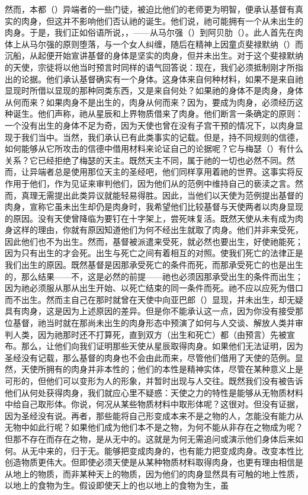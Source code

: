 然而，本都（）异端者的一些门徒，被迫比他们的老师更为明智，便承认基督有真实的肉身，但这并不影响他们否认祂的诞生。他们说，祂可能拥有一个从未出生的肉身。于是，我们正如俗语所说，，——从马尔强（）到阿贝肋（）。此人首先在肉体上从马尔强的原则堕落，与一个女人纠缠，随后在精神上因童贞斐禄默纳（）而沉船，从起便开始宣讲基督的身体是坚实的肉身，但并未出生。对于这个斐禄默纳的天使，宗徒将以他当时预言时同样的语气回答说：现在，我们必须抵制刚才所指出的论据。他们承认基督确实有一个身体。这身体来自何种材料，如果不是来自祂显现时所借以显现的那种同类东西，又是来自何处？如果祂的身体不是肉身，身体从何而来？如果肉身不是出生的，肉身从何而来？因为，要成为肉身，必须经历这种诞生。他们声称，祂从星辰和上界物质借来了肉身。他们断言一条确定的原则：一个没有出生的身体不足为奇，因为天使也曾在没有子宫干预的情况下，以肉身显现于我们当中。当然，我们承认已有此类事实的记载。但是，持不同规则的信德，如何能够从它所攻击的信德中借用材料来论证自己的论据呢？它与梅瑟（）有什么关系？它已经拒绝了梅瑟的天主。既然天主不同，属于祂的一切也必然不同。然而，让异端者总是使用那位天主的圣经吧，他们同样享用着祂的世界。这事实将反作用于他们，作为见证来审判他们，因为他们从的范例中维持自己的亵渎之言。然而，真理无需提出此类异议就能轻易得胜。因此，当他们以天使为范例提出基督的肉身，宣称它虽未出生却仍是肉身时，我希望他们比较基督与天使两者以肉身显现的原因。没有天使曾降临为要钉在十字架上，尝死味复活。既然天使从未有成为肉身这样的理由，你就有原因知道他们为何不经出生就取了肉身。他们并非来受死，因此他们也不为出生。然而，基督被派遣来受死，就必然也要出生，好使祂能死；因为只有出生的才会死。出生与死亡之间有着相互的对照。使我们死亡的法律正是我们出生的原因。既然基督是因那承受死亡的条件而死，而那承受死亡的也是出生的，那么结果——不，这是必然的前提——祂也必须因那承受出生的条件而出生；因为祂必须服从那从出生开始、以死亡结束的同一条件而死。祂不应以应死为借口而不出生。然而主自己在那时就曾在天使中向亚巴郎（）显现，并未出生，却无疑具有肉身，这是因为上述原因的差异。但是你不能承认这一点，因为你没有接受那位基督，祂当时就在那尚未出生的肉身形态中预演了如何与人交谈、解放人类并审判人类，因为祂那时还不打算死，直到双方（出生和死亡）都（由预言）先被宣布。那么，让他们向我们证明那些天使从星辰取得肉身。如果他们无法证明，因为圣经没有记载，那么基督的肉身也不会由此而来，尽管他们借用了天使的范例。显然，天使所拥有的肉身并非本性的；他们的本性是精神实体，尽管在某种意义上是可形的，但他们可以变形为人的形象，并暂时出现与人交往。既然我们没有被告诉他们从何处获得肉身，我们就应心里不疑惑：天使之力的特性是能够从无物质材料中给自己取形体。你说，何况从某些物质材料中取形体呢？这很对。但没有证据，因为圣经没有说。再者，那些能将自己形变成本来不是之物的人，怎能没有能力从无物中如此行呢？如果他们成为他们本不是之物，为何不能从非存在之物成为呢？但那不存在而存在之物，是从无中的。这就是为何无需追问或演示他们身体后来如何。从无中来的，归于无。能够把变成肉身的，也有能力把变成肉身。改变本性比创造物质更伟大。但即使必须天使是从某种物质材料取得肉身，也更有理由相信是从地上的物质，而非某种天上的物质，因为他们的肉身显然具有可触的地上性质，以地上的食物为生。假设即使天上的也以地上的食物为生，虽